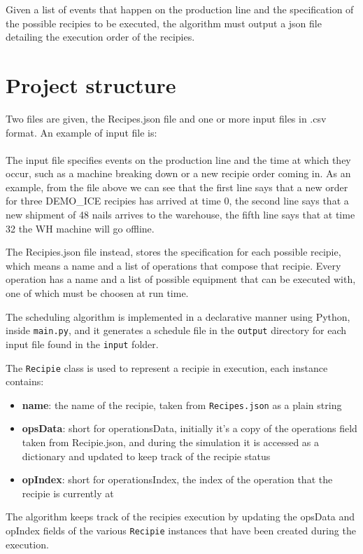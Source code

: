 \documentclass[12pt]{article}
\newcommand{\code}[1]{\colorbox{light-gray}{\texttt{#1}}}
\begin{document}
Given a list of events that happen on the production line and the specification of the possible recipies to be executed, the algorithm must output a json file detailing the execution order of the recipies.

\section{Project structure}
Two files are given, the Recipes.json file and one or more input files in .csv format.
An example of input file is:
\\
\\

The input file specifies events on the production line and the time at which they occur, such as a machine breaking down or a new recipie order coming in. As an example, from the file above we can see that the first line says that a new order for three DEMO\_ICE recipies has arrived at time 0, the second line says that a new shipment of 48 nails arrives to the warehouse, the fifth line says that at time 32 the WH machine will go offline.

The Recipies.json file instead, stores the specification for each possible recipie, which means a name and a list of operations that compose that recipie. Every operation has a name and a list of possible equipment that can be executed with, one of which must be choosen at run time.

The scheduling algorithm is implemented in a declarative manner using Python, inside \code{main.py}, and it generates a schedule file in the \code{output} directory for each input file found in the \code {input} folder.

The \code{Recipie} class is used to represent a recipie in execution, each instance contains:
\begin{itemize}
\item \textbf{name}: the name of the recipie, taken from \code{Recipes.json} as a plain string
\item \textbf{opsData}: short for operationsData, initially it's a copy of the operations field taken from Recipie.json, and during the simulation it is accessed as a dictionary and updated to keep track of the recipie status
\item \textbf{opIndex}: short for operationsIndex, the index of the operation that the recipie is currently at
\end{itemize}
The algorithm keeps track of the recipies execution by updating the opsData and opIndex fields of the various \code{Recipie} instances that have been created during the execution.
\end{document}
